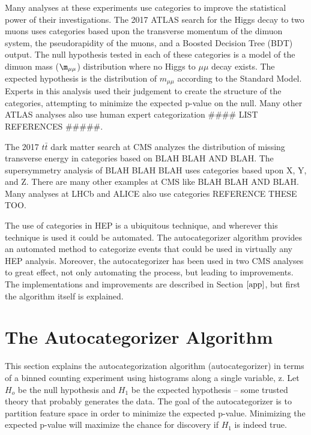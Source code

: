\documentclass[review]{elsarticle}
\begin{document}
Many analyses at these experiments use categories to improve the statistical power of their investigations. The 2017 ATLAS search for the Higgs decay to two muons \cite{atlashmumu2017} uses categories based upon the transverse momentum of the dimuon system, the pseudorapidity of the muons, and a Boosted Decision Tree (BDT) output. The null hypothesis tested in each of these categories is a model of the dimuon mass ($\m_{\mu\mu}$) distribution where no Higgs to $\mu\mu$ decay exists. The expected hypothesis is the distribution of $m_{\mu\mu}$ according to the Standard Model. Experts in this analysis used their judgement to create the structure of the categories, attempting to minimize the expected p-value on the null. Many other ATLAS analyses also use human expert categorization #### LIST REFERENCES #####. 

The 2017 $t\bar{t}$ dark matter search at CMS analyzes the distribution of missing transverse energy in categories based on BLAH BLAH AND BLAH. The supersymmetry analysis of BLAH BLAH BLAH uses categories based upon X, Y, and Z. There are many other examples at CMS like BLAH BLAH AND BLAH. Many analyses at LHCb and ALICE also use categories REFERENCE THESE TOO. 

The use of categories in HEP is a ubiquitous technique, and wherever this technique is used it could be automated. The autocategorizer algorithm provides an automated method to categorize events that could be used in virtually any HEP analysis. Moreover, the autocategorizer has been used in two CMS analyses to great effect, not only automating the process, but leading to improvements. The implementations and improvements are described in Section $\ref{app}$, but first the algorithm itself is explained.

\section{The Autocategorizer Algorithm}
\label{acat}
This section explains the autocategorization algorithm (autocategorizer) in terms of a binned counting experiment using histograms along a single variable, z. Let $H_o$ be the null hypothesis and $H_1$ be the expected hypothesis -- some trusted theory that probably generates the data. The goal of the autocategorizer is to partition feature space in order to minimize the expected p-value. Minimizing the expected p-value will maximize the chance for discovery if $H_1$ is indeed true.   
\end{document}
